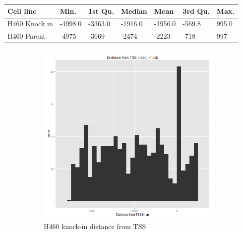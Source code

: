 \documentclass[11pt]{article}
\begin{document}
\begin{table}[H]
\centering
    \begin{tabular}{|l|l|l|l|l|l|l|}
    \hline
     Cell line & Min. & 1st Qu. & Median & Mean & 3rd Qu. &   Max.  \\ \hline
   H460 Knock in  & -4998.0 & -3363.0 & -1916.0 & -1956.0 & -569.8 & 995.0  \\ \hline
   H460 Parent & -4975 &  -3669 &  -2474 &  -2223 &   -718  &   997  \\ \hline
    \end{tabular}
\end{table}

\begin{figure}[H]
\centering
\begin{subfigure}{.4\textwidth}
  \includegraphics[scale=0.3]{distribution_knocking.png}
  \caption{H460 knock-in distance from TSS}
  \label{fig:sub1}
\end{subfigure}
\quad
\begin{subfigure}{.4\textwidth}

\end{subfigure}
\end{figure}
\end{document}
